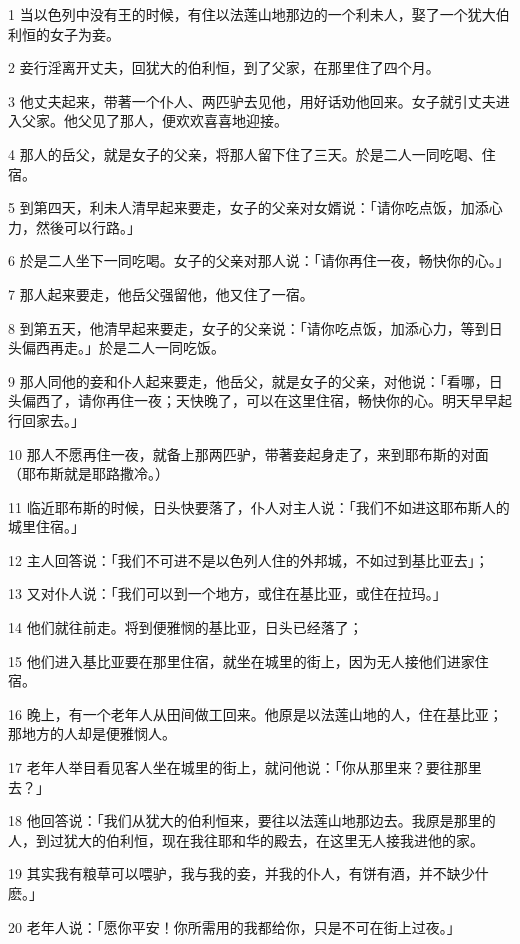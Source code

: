 \par 1 当以色列中没有王的时候，有住以法莲山地那边的一个利未人，娶了一个犹大伯利恒的女子为妾。
\par 2 妾行淫离开丈夫，回犹大的伯利恒，到了父家，在那里住了四个月。
\par 3 他丈夫起来，带著一个仆人、两匹驴去见他，用好话劝他回来。女子就引丈夫进入父家。他父见了那人，便欢欢喜喜地迎接。
\par 4 那人的岳父，就是女子的父亲，将那人留下住了三天。於是二人一同吃喝、住宿。
\par 5 到第四天，利未人清早起来要走，女子的父亲对女婿说：「请你吃点饭，加添心力，然後可以行路。」
\par 6 於是二人坐下一同吃喝。女子的父亲对那人说：「请你再住一夜，畅快你的心。」
\par 7 那人起来要走，他岳父强留他，他又住了一宿。
\par 8 到第五天，他清早起来要走，女子的父亲说：「请你吃点饭，加添心力，等到日头偏西再走。」於是二人一同吃饭。
\par 9 那人同他的妾和仆人起来要走，他岳父，就是女子的父亲，对他说：「看哪，日头偏西了，请你再住一夜；天快晚了，可以在这里住宿，畅快你的心。明天早早起行回家去。」
\par 10 那人不愿再住一夜，就备上那两匹驴，带著妾起身走了，来到耶布斯的对面（耶布斯就是耶路撒冷。）
\par 11 临近耶布斯的时候，日头快要落了，仆人对主人说：「我们不如进这耶布斯人的城里住宿。」
\par 12 主人回答说：「我们不可进不是以色列人住的外邦城，不如过到基比亚去」；
\par 13 又对仆人说：「我们可以到一个地方，或住在基比亚，或住在拉玛。」
\par 14 他们就往前走。将到便雅悯的基比亚，日头已经落了；
\par 15 他们进入基比亚要在那里住宿，就坐在城里的街上，因为无人接他们进家住宿。
\par 16 晚上，有一个老年人从田间做工回来。他原是以法莲山地的人，住在基比亚；那地方的人却是便雅悯人。
\par 17 老年人举目看见客人坐在城里的街上，就问他说：「你从那里来？要往那里去？」
\par 18 他回答说：「我们从犹大的伯利恒来，要往以法莲山地那边去。我原是那里的人，到过犹大的伯利恒，现在我往耶和华的殿去，在这里无人接我进他的家。
\par 19 其实我有粮草可以喂驴，我与我的妾，并我的仆人，有饼有酒，并不缺少什麽。」
\par 20 老年人说：「愿你平安！你所需用的我都给你，只是不可在街上过夜。」
